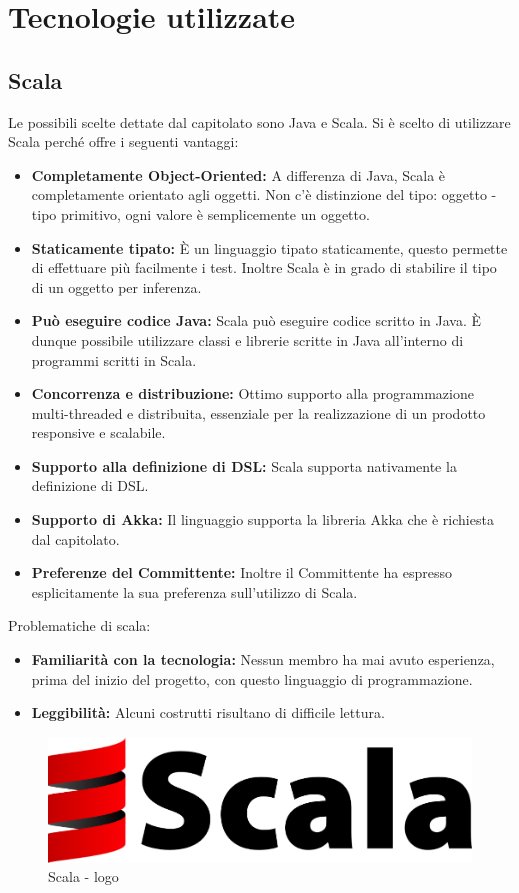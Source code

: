 \documentclass[a4paper]{article}
\begin{document}
		
	\newpage 
	\section{Tecnologie utilizzate}
	\subsection{Scala}
		Le possibili scelte dettate dal capitolato sono Java e Scala. Si è scelto di utilizzare Scala perché offre i seguenti vantaggi:
		\begin{itemize}
            \item \textbf{Completamente Object-Oriented:} A differenza di Java, Scala è completamente orientato agli oggetti. Non c'è distinzione del tipo: oggetto - tipo primitivo, ogni valore è semplicemente un oggetto.
			\item \textbf{Staticamente tipato:} È un linguaggio tipato staticamente, questo permette di effettuare più facilmente i test. Inoltre Scala è in grado di stabilire il tipo di un oggetto per inferenza.
            \item \textbf{Può eseguire codice Java:} Scala può eseguire codice scritto in Java. È dunque possibile utilizzare classi e librerie scritte in Java all'interno di programmi scritti in Scala. 
            \item \textbf{Concorrenza e distribuzione:} Ottimo supporto alla programmazione multi-threaded e distribuita, essenziale per la realizzazione di un prodotto responsive e scalabile.
			\item \textbf{Supporto alla definizione di DSL:} Scala supporta nativamente la definizione di DSL.
            \item \textbf{Supporto di Akka:} Il linguaggio supporta la libreria Akka che è richiesta dal capitolato.
		\item \textbf{Preferenze del Committente:} Inoltre il Committente ha espresso esplicitamente la sua preferenza sull'utilizzo di Scala.
		\end{itemize}
		Problematiche di scala:
		\begin{itemize}
		\item \textbf{Familiarità con la tecnologia:} Nessun membro ha mai avuto esperienza, prima del inizio del progetto, con questo linguaggio di programmazione.
		\item \textbf{Leggibilità:} Alcuni costrutti risultano di difficile lettura.
		\end{itemize}
		\begin{figure} [H]
			\centering
			\includegraphics[scale=0.15]{immagini/ST/scala.png}
			\caption{Scala - logo}
		\end{figure}	
\end{document}
